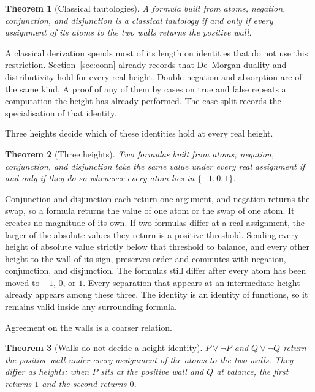 \documentclass[a4paper]{article}
\newtheorem{theorem}{Theorem}[section]
\theoremstyle{definition}
\begin{document}
\begin{theorem}[Classical tautologies]
\label{thm:wall}
A formula built from atoms, negation, conjunction, and disjunction is a
classical tautology if and only if every assignment of its atoms to the
two walls returns the positive wall.
\end{theorem}

A classical derivation spends most of its length on identities that do
not use this restriction. Section~\ref{sec:conn} already records that
De~Morgan duality and distributivity hold for every real height. Double
negation and absorption are of the same kind. A proof of any of them by
cases on true and false repeats a computation the height has already
performed. The case split records the specialisation of that identity.

Three heights decide which of these identities hold at every real height.

\begin{theorem}[Three heights]
\label{thm:three}
Two formulas built from atoms, negation, conjunction, and disjunction
take the same value under every real assignment if and only if they do
so whenever every atom lies in \(\{-1,0,1\}\).
\end{theorem}

Conjunction and disjunction each return one argument, and negation
returns the swap, so a formula returns the value of one atom or the
swap of one atom. It creates no magnitude of its own. If two formulas
differ at a real assignment, the larger of the absolute values they
return is a positive threshold. Sending every height of absolute value
strictly below that threshold to balance, and every other height to
the wall of its sign, preserves order and commutes with negation,
conjunction, and disjunction. The formulas still differ after every atom has been moved
to \(-1\), \(0\), or \(1\). Every separation that appears at an
intermediate height already appears among these three. The identity is
an identity of functions, so it remains valid inside any surrounding
formula.

Agreement on the walls is a coarser relation.

\begin{theorem}[Walls do not decide a height identity]
\label{thm:walls-coarse}
\(P\vee\neg P\) and \(Q\vee\neg Q\) return the positive wall under
every assignment of the atoms to the two walls. They differ as heights:
when \(P\) sits at the positive wall and \(Q\) at balance, the first
returns \(1\) and the second returns \(0\).
\end{theorem}
\end{document}
